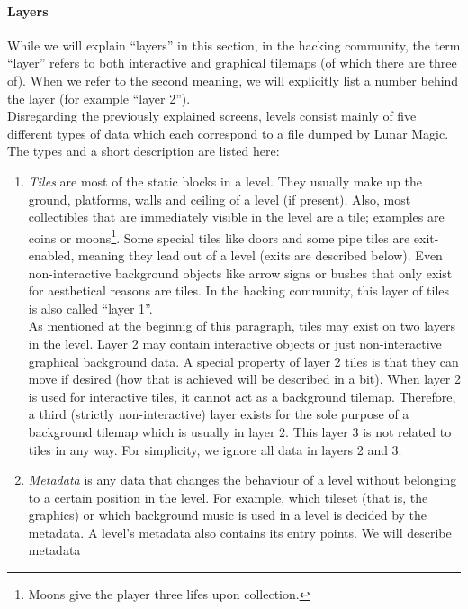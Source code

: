\paragraph{Layers}
\label{par:layers}

While we will explain ``layers'' in this section, in the hacking
community, the term ``layer'' refers to both interactive and graphical
tilemaps (of which there are three of). When we refer to the second
meaning, we will explicitly list a number behind the layer (for
example ``layer 2''). \\
Disregarding the previously explained screens, levels consist mainly
of five different types of data which each correspond to a file dumped
by Lunar Magic. The types and a short description are listed here:
\begin{enumerate}
\item \emph{Tiles} are most of the static blocks in a level. They
  usually make up the ground, platforms, walls and ceiling of a level
  (if present). Also, most collectibles that are immediately visible
  in the level are a tile; examples are coins or moons\footnote{Moons
    give the player three lifes upon collection.}. Some special tiles
  like doors and some pipe tiles are exit-enabled, meaning they lead
  out of a level (exits are described below). Even non-interactive
  background objects like arrow signs or bushes that only exist for
  aesthetical reasons are tiles. In the hacking community, this layer
  of tiles is also called ``layer 1''. \\
  As mentioned at the beginnig of this paragraph, tiles may exist on
  two layers in the level. Layer 2 may contain interactive objects or
  just non-interactive graphical background data. A special property
  of layer 2 tiles is that they can move if desired (how that is
  achieved will be described in a bit). When layer 2 is used for
  interactive tiles, it cannot act as a background tilemap. Therefore,
  a third (strictly non-interactive) layer exists for the sole purpose
  of a background tilemap which is usually in layer 2. This layer 3 is
  not related to tiles in any way. For simplicity, we ignore all data
  in layers 2 and 3.
\item \emph{Metadata} is any data that changes the behaviour of a
  level without belonging to a certain position in the level. For
  example, which tileset (that is, the graphics) or which background
  music is used in a level is decided by the metadata. A level's
  metadata also contains its entry points. We will describe metadata

\end{enumerate}
